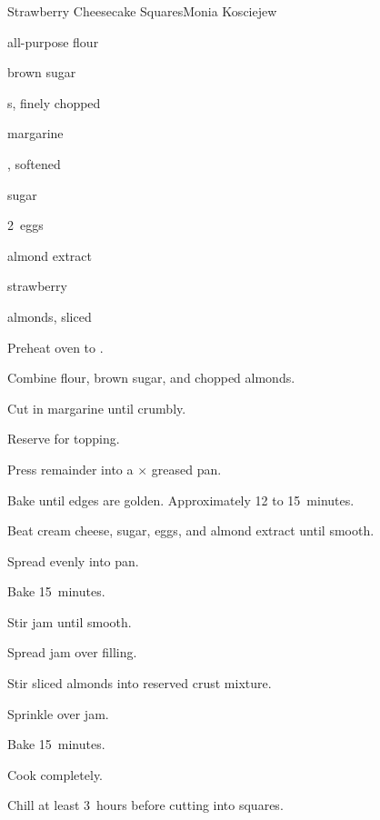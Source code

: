 \begin{recipe}{Strawberry Cheesecake Squares}{Monia Kosciejew}{}

\begin{ingredients}
\item {} all-purpose flour
\item \C{\threequarter} brown sugar
\item \C{\threequarter} s, finely chopped
\item \C{\threequarter} margarine
\item {} , softened
\item \C{\twothird} sugar
\item 2~eggs
\item \tp{\half} almond extract
\item {} strawberry 
\item \C{\threequarter} almonds, sliced
\end{ingredients}

\begin{directions}
\item Preheat oven to .
\item Combine flour, brown sugar, and chopped almonds.
\item Cut in margarine until crumbly.
\item Reserve \C{\threequarter} for topping.
\item Press remainder into a $\times$ greased pan.
\item Bake until edges are golden. Approximately 12 to 15~minutes.
\item Beat cream cheese, sugar, eggs, and almond extract until smooth.
\item Spread evenly into pan.
\item Bake 15~minutes.
\item Stir jam until smooth.
\item Spread jam over filling.
\item Stir sliced almonds into reserved crust mixture.
\item Sprinkle over jam.
\item Bake 15~minutes.
\item Cook completely.
\item Chill at least 3~hours before cutting into squares.
\end{directions}

\end{recipe}
